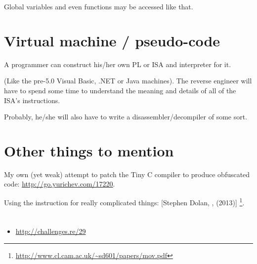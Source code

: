 Global variables and even functions may be accessed like that.

\section{Virtual machine / pseudo-code}

A programmer can construct his/her own \ac{PL} or \ac{ISA} and interpreter for it.

(Like the pre-5.0 Visual Basic, .NET or Java machines).
The reverse engineer will have to spend some time to understand the meaning 
and details of all of the \ac{ISA}'s instructions.

Probably, he/she will also have to write a disassembler/decompiler of some sort.

\section{Other things to mention}

My own (yet weak) attempt to patch the Tiny C compiler to produce obfuscated code: \url{http://go.yurichev.com/17220}.

Using the \MOV 
instruction for really complicated things: 
[Stephen Dolan, , (2013)]
\footnote{\AlsoAvailableAs \url{http://www.cl.cam.ac.uk/~sd601/papers/mov.pdf}}. 

\section{\Exercise}

\begin{itemize}
	\item \url{http://challenges.re/29}
\end{itemize}

